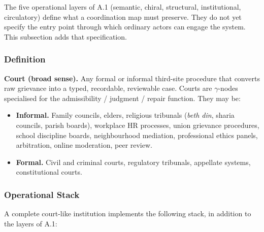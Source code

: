 \documentclass[
]{article}
\providecommand{\tightlist}{%
  \setlength{\itemsep}{0pt}\setlength{\parskip}{0pt}}
\begin{document}
The five operational layers of A.1 (semantic, chiral, structural,
institutional, circulatory) define what a coordination map must
preserve. They do not yet specify the entry point through which
ordinary actors can engage the system. This subsection adds that
specification.

\subsubsection*{Definition}

\textbf{Court (broad sense).} Any formal or informal third-site
procedure that converts raw grievance into a typed, recordable,
reviewable case. Courts are \(\gamma\)-nodes specialised for the
admissibility / judgment / repair function. They may be:

\begin{itemize}
\tightlist
\item
  \textbf{Informal.} Family councils, elders, religious tribunals
  (\emph{beth din}, sharia councils, parish boards), workplace
  HR processes, union grievance procedures, school discipline
  boards, neighbourhood mediation, professional ethics panels,
  arbitration, online moderation, peer review.
\item
  \textbf{Formal.} Civil and criminal courts, regulatory tribunals,
  appellate systems, constitutional courts.
\end{itemize}

\subsubsection*{Operational Stack}

A complete court-like institution implements the following stack,
in addition to the layers of A.1:
\end{document}
